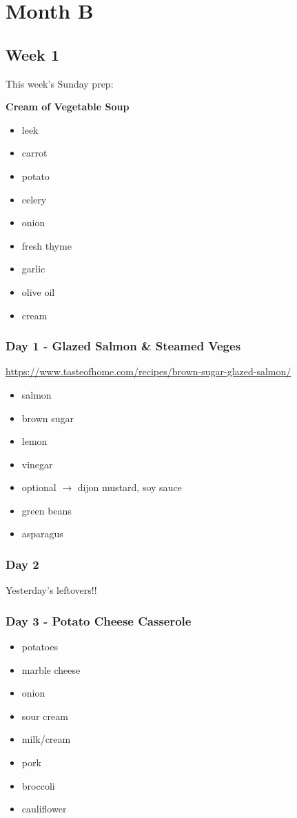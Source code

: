 \documentclass[11pt, a4paper]{article}
\begin{document}
\pagebreak
\section{Month B}

\subsection{Week 1}

This week's Sunday prep:
\par
\vspace{1pc}
\noindent\textbf{Cream of Vegetable Soup}
\par
\begin{itemize}
\item leek
\item carrot
\item potato
\item celery
\item onion
\item fresh thyme
\item garlic
\item olive oil
\item cream
\end{itemize}

\subsubsection{Day 1 - Glazed Salmon \& Steamed Veges}
\vspace{1pc}
\small{\url{https://www.tasteofhome.com/recipes/brown-sugar-glazed-salmon/}}
\begin{itemize}
\item salmon
\item brown sugar
\item lemon
\item vinegar
\item optional $\longrightarrow$ dijon mustard, soy sauce
\item green beans
\item asparagus
\end{itemize}

\subsubsection{Day 2}
\vspace{1pc}
Yesterday's leftovers!!

\subsubsection{Day 3 - Potato Cheese Casserole}
\vspace{1pc}
\begin{itemize}
\item potatoes
\item marble cheese
\item onion
\item sour cream
\item milk/cream
\item pork
\item broccoli
\item cauliflower
\end{itemize}
\end{document}
